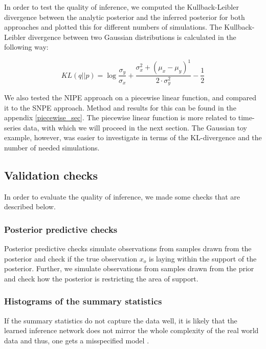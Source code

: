 \documentclass[12pt]{extreport}
\begin{document}
In order to test the quality of inference, we computed the Kullback-Leibler divergence between the analytic posterior and the inferred posterior for both approaches and plotted this for different numbers of simulations. The Kullback-Leibler divergence between two Gaussian distributions is calculated in the following way:

\begin{equation}
KL(q||p) = \log{\frac{\sigma_y}{\sigma_x}} + \frac{\sigma_x^2 + (\mu_x -\mu_y)^1}{2\cdot\sigma_y^2} -\frac{1}{2}
\end{equation}


We also tested the NIPE approach on a piecewise linear function, and compared it to the SNPE approach. Method and results for this can be found in the appendix \ref{piecewise_sec}. The piecewise linear function is more related to time-series data, with which we will proceed in the next section. The Gaussian toy example, however, was easier to investigate in terms of the KL-divergence and the number of needed simulations.


\subsection{Validation checks}


In order to evaluate the quality of inference, we made some checks that are described below.

\subsubsection{Posterior predictive checks}
\label{sec:ppc}

Posterior predictive checks simulate observations from samples drawn from the posterior and check if the true observation $x_o$ is laying within the support of the posterior. Further, we simulate observations from samples drawn from the prior and check how the posterior is restricting the area of support.


\subsubsection{Histograms of the summary statistics}


If the summary statistics do not capture the data well, it is likely that the learned inference network does not mirror the whole complexity of the real world data and thus, one gets a misspecified model \citep{schmitt2021bayesflow}.
\end{document}
